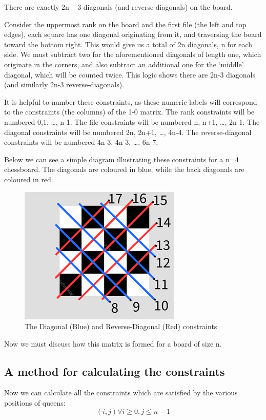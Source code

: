 \documentclass{article}
\begin{document}
There are exactly 2n – 3 diagonals (and reverse-diagonals) on the board. 

Consider the uppermost rank on the board and the first file (the left and top edges), each square has one diagonal originating from it, and traversing the board toward the bottom right. This would give us a total of 2n diagonals, n for each side. We must subtract two for the aforementioned diagonals of length one, which originate in the corners, and also subtract an additional one for the ‘middle’ diagonal, which will be counted twice. This logic shows there are 2n-3 diagonals (and similarly 2n-3 reverse-diagonals).

It is helpful to number these constraints, as these numeric labels will correspond to the constraints (the columns) of the 1-0 matrix.
The rank constraints will be numbered 0,1, …, n-1.
The file constraints will be numbered n, n+1, …, 2n-1.
The diagonal constraints will be numbered 2n, 2n+1, …, 4n-4.
The reverse-diagonal constraints will be numbered 4n-3, 4n-3, …, 6n-7.

Below we can see a simple diagram illustrating these constraints for a n=4 chessboard.
The diagonals are coloured in blue, while the back diagonals are coloured in red.

\begin{figure}[ht]
\centering
\includegraphics[scale=1]{images/chess2.png}
\caption{The Diagonal (Blue) and Reverse-Diagonal (Red) constraints}
\label{fig: The Diagonal (Blue) and Reverse-Diagonal (Red) constraints}
\end{figure}

Now we must discuss how this matrix is formed for a board of size n.
\subsection{A method for calculating the constraints}
Now we can calculate all the constraints which are satisfied by the various positions of queens:	
$$(i,j) \forall  i \geq 0 , j \leq n-1$$
\end{document}
